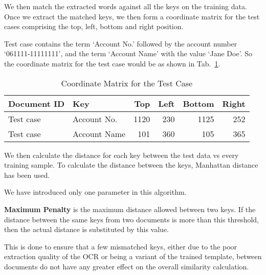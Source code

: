\documentclass[runningheads]{llncs}
\begin{document}
We then match the extracted words against all the keys on the training data. Once we extract the matched keys, we then form a coordinate matrix for the test cases comprising the top, left, bottom and right position. 
\begin{example}
Test case contains the term `Account No.’ followed by the account number `061111-11111111’, and the term `Account Name’ with the value `Jane Doe’. So the coordinate matrix for the test case would be as shown in Tab.~\ref{matrix2}.
\end{example}
\begin{table}
\centering
\caption{Coordinate Matrix for the Test Case}\label{matrix2}
\begin{tabular}{|l|l|r|r|r|r|}
\hline
Document ID & Key & Top & Left & Bottom & Right\\
\hline
Test case & Account No. & 1120 & 230 & 1125 & 252\\
Test case & Account Name & 101 & 360 & 105 & 365\\
\hline
\end{tabular}
\end{table}

We then calculate the distance for each key between the test data vs every training sample. To calculate the distance between the keys, Manhattan distance has been used.

We have introduced only one parameter in this algorithm.
\begin{definition}
\textbf{Maximum Penalty} is the maximum distance allowed between two keys. If the distance between the same keys from two documents is more than this threshold, then the actual distance is substituted by this value.
\end{definition}

This is done to ensure that a few mismatched keys, either due to the poor extraction quality of the OCR or being a variant of the trained template, between documents do not have any greater effect on the overall similarity calculation.
\end{document}
